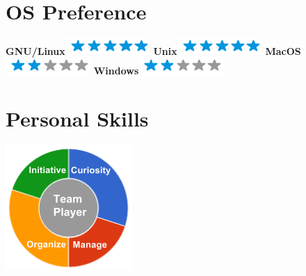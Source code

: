 \documentclass[]{friggeri-cv}
\begin{document}
\begin{aside}
  \section{OS Preference}
    \textbf{GNU/Linux}\includegraphics[scale=0.40]{img/5stars.png}
    \textbf{Unix}\includegraphics[scale=0.40]{img/5stars.png}
    \textbf{MacOS}\includegraphics[scale=0.40]{img/2stars.png}
    \textbf{Windows}\includegraphics[scale=0.40]{img/2stars.png}
    ~
  \section{Personal Skills}
    \includegraphics[scale=0.62]{img/personal.png}
    ~
\end{aside}
\end{document}
